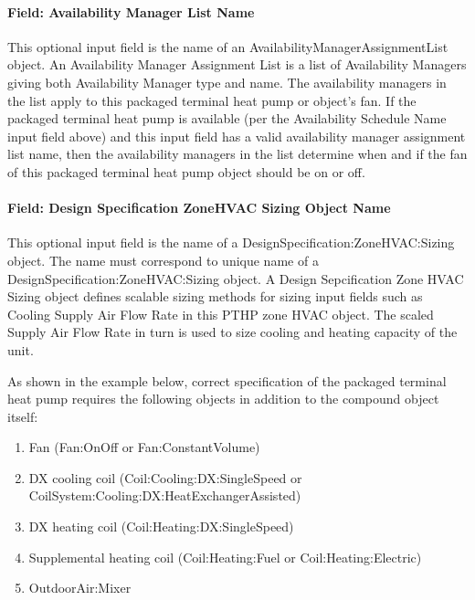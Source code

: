 \paragraph{Field: Availability Manager List Name}\label{field-availability-manager-list-name-7}

This optional input field is the name of an AvailabilityManagerAssignmentList object. An Availability Manager Assignment List is a list of Availability Managers giving both Availability Manager type and name. The availability managers in the list apply to this packaged terminal heat pump or object's fan. If the packaged terminal heat pump is available (per the Availability Schedule Name input field above) and this input field has a valid availability manager assignment list name, then the availability managers in the list determine when and if the fan of this packaged terminal heat pump object should be on or off.

\paragraph{Field: Design Specification ZoneHVAC Sizing Object Name}\label{field-design-specification-zonehvac-sizing-object-name-7}

This optional input field is the name of a DesignSpecification:ZoneHVAC:Sizing object. The name must correspond to unique name of a DesignSpecification:ZoneHVAC:Sizing object. A Design Sepcification Zone HVAC Sizing object defines scalable sizing methods for sizing input fields such as Cooling Supply Air Flow Rate in this PTHP zone HVAC object. The scaled Supply Air Flow Rate in turn is used to size cooling and heating capacity of the unit.

As shown in the example below, correct specification of the packaged terminal heat pump requires the following objects in addition to the compound object itself:

\begin{enumerate}
\def\labelenumi{\arabic{enumi})}
\item
  Fan (Fan:OnOff or Fan:ConstantVolume)
\item
  DX cooling coil (Coil:Cooling:DX:SingleSpeed or CoilSystem:Cooling:DX:HeatExchangerAssisted)
\item
  DX heating coil (Coil:Heating:DX:SingleSpeed)
\item
  Supplemental heating coil (Coil:Heating:Fuel or Coil:Heating:Electric)
\item
  OutdoorAir:Mixer
\end{enumerate}

